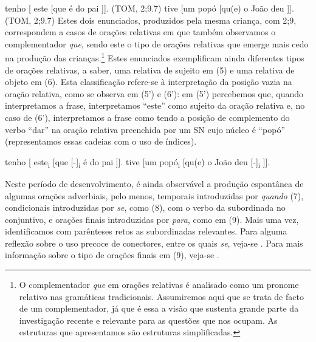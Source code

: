 \documentclass[output=paper,colorlinks,citecolor=brown,booklanguage=portuguese]{langscibook}
\begin{document}
\ea
    \label{ex:13:5} tenho  [ este  [que é do pai ]]. \hfill(TOM, 2;9.7)
    \z
\ea
    \label{ex:13:6} tive [um popó  [qu(e) o João deu ]]. \hfill	(TOM, 2;9.7)
\z
Estes dois enunciados, produzidos pela mesma criança, com 2;9, correspondem a casos de orações relativas em que também observamos o complementador \emph{que}, sendo este o tipo de orações relativas que emerge mais cedo na produção das crianças.\footnote{O complementador \emph{que} em orações relativas é analisado como um pronome relativo nas gramáticas tradicionais. Assumiremos aqui que se trata de facto de um complementador, já que é essa a visão que sustenta grande parte da investigação recente e relevante para as questões que nos ocupam. As estruturas que apresentamos são estruturas simplificadas.} Estes enunciados exemplificam ainda diferentes tipos de orações relativas, a saber, uma relativa de sujeito em (5) e uma relativa de objeto em (6). Esta classificação refere-se à interpretação da posição vazia na oração relativa, como se observa em (5’) e (6’): em (5’) percebemos que, quando interpretamos a frase, interpretamos “este” como sujeito da oração relativa e, no caso de (6’), interpretamos a frase como tendo a posição de complemento do verbo “dar” na oração relativa preenchida por um SN cujo núcleo é “popó” (representamos essas cadeias com o uso de índices).

\begin{exe}
  tenho  [ este\textsubscript{i}  [que [-]\textsubscript{i}  é do pai ]].
 tive [um popó\textsubscript{i}  [qu(e) o João deu  [-]\textsubscript{i} ]].
\end{exe}

Neste período de desenvolvimento, é ainda observável a produção espontânea de algumas orações adverbiais, pelo menos, temporais introduzidas por \emph{quando} (7), condicionais introduzidas por \emph{se}, como (8), com o verbo da subordinada no conjuntivo, e orações finais introduzidas por \emph{para}, como em (9). Mais uma vez, identificamos com parênteses retos as subordinadas relevantes. Para alguma reflexão sobre o uso precoce de conectores, entre os quais \emph{se}, veja-se \citet{Costa2008}. Para mais informação sobre o tipo de orações finais em (9), veja-se \citet{Santos2013}.
\end{document}
